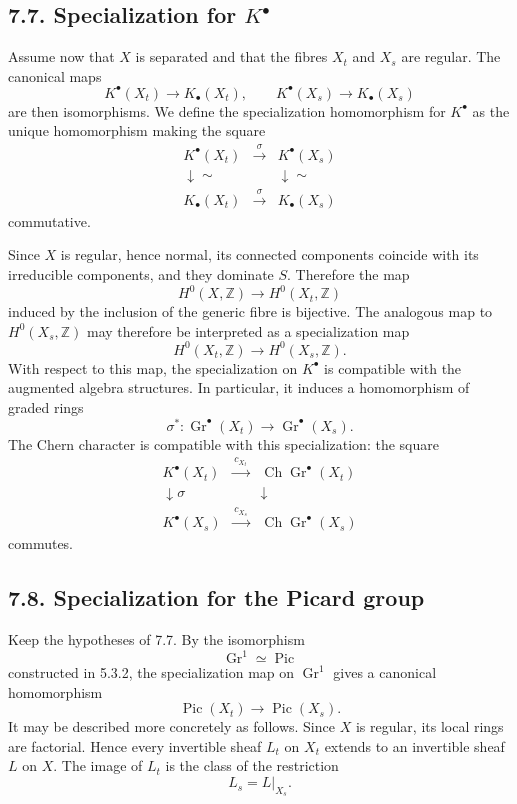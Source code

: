 \documentclass[12pt]{article}
\newcommand{\ZZ}{\mathbb Z}
\newcommand{\Pic}{\operatorname{Pic}}
\newcommand{\Gr}{\operatorname{Gr}}
\newcommand{\Ch}{\operatorname{Ch}}
\newcommand{\xto}[1]{\xrightarrow{#1}}
\newcommand{\longto}{\longrightarrow}
\begin{document}
\subsection*{7.7. Specialization for $K^\bullet$}

Assume now that $X$ is separated and that the fibres $X_t$ and $X_s$ are regular. The canonical maps
\[
K^\bullet(X_t)\longto K_\bullet(X_t),
\qquad
K^\bullet(X_s)\longto K_\bullet(X_s)
\]
are then isomorphisms. We define the specialization homomorphism for $K^\bullet$ as the unique homomorphism making the square
\[
\begin{array}{ccc}
K^\bullet(X_t)&\xto{\,\sigma\,}&K^\bullet(X_s)\\
\downarrow\scriptstyle\sim&&\downarrow\scriptstyle\sim\\
K_\bullet(X_t)&\xto{\,\sigma\,}&K_\bullet(X_s)
\end{array}
\]
commutative.

Since $X$ is regular, hence normal, its connected components coincide with its irreducible components, and they dominate $S$. Therefore the map
\[
H^0(X,\ZZ)\longto H^0(X_t,\ZZ)
\]
induced by the inclusion of the generic fibre is bijective. The analogous map to $H^0(X_s,\ZZ)$ may therefore be interpreted as a specialization map
\[
H^0(X_t,\ZZ)\longto H^0(X_s,\ZZ).
\]
With respect to this map, the specialization on $K^\bullet$ is compatible with the augmented algebra structures. In particular, it induces a homomorphism of graded rings
\[
\sigma^*:\Gr^\bullet(X_t)\longto\Gr^\bullet(X_s).
\]
The Chern character is compatible with this specialization: the square
\[
\begin{array}{ccc}
K^\bullet(X_t)&\xto{\,c_{X_t}\,}&\Ch\Gr^\bullet(X_t)\\
\downarrow\scriptstyle\sigma&&\downarrow\\
K^\bullet(X_s)&\xto{\,c_{X_s}\,}&\Ch\Gr^\bullet(X_s)
\end{array}
\]
commutes.

\subsection*{7.8. Specialization for the Picard group}

Keep the hypotheses of 7.7. By the isomorphism
\[
\Gr^1\simeq\Pic
\]
constructed in 5.3.2, the specialization map on $\Gr^1$ gives a canonical homomorphism
\[
\Pic(X_t)\longto\Pic(X_s).
\]
It may be described more concretely as follows. Since $X$ is regular, its local rings are factorial. Hence every invertible sheaf $L_t$ on $X_t$ extends to an invertible sheaf $L$ on $X$. The image of $L_t$ is the class of the restriction
\[
L_s=L|_{X_s}.
\]
\end{document}
